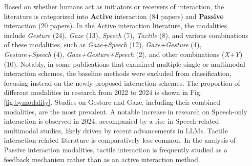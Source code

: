 \documentclass[review]{fcs}
\begin{document}
Based on whether humans act as initiators or receivers of interaction, the literature is categorized into \textbf{Active} interaction (84 papers) and \textbf{Passive} interaction (20 papers). In the Active interaction literature, the modalities include \textit{Gesture} (24), \textit{Gaze} (13), \textit{Speech} (7), \textit{Tactile} (8), and various combinations of these modalities, such as \textit{Gaze+Speech} (12), \textit{Gaze+Gesture} (4), \textit{Gesture+Speech} (4), \textit{Gaze+Gesture+Speech} (2), and other combinations (\textit{X+Y}) (10). Notably, in some publications that examined multiple single or multimodal interaction schemes, the baseline methods were excluded from classification, focusing instead on the newly proposed interaction schemes. The proportion of different modalities in research from 2022 to 2024 is shown in Fig. \ref{fig:bymodality}.
Studies on Gesture and Gaze, including their combined modalities, are the most prevalent. A notable increase in research on Speech-only interaction is observed in 2024, accompanied by a rise in Speech-related multimodal studies, likely driven by recent advancements in LLMs. Tactile interaction-related literature is comparatively less common. In the analysis of Passive interaction modalities, tactile interaction is frequently studied as a feedback mechanism rather than as an active interaction method.

\end{document}
